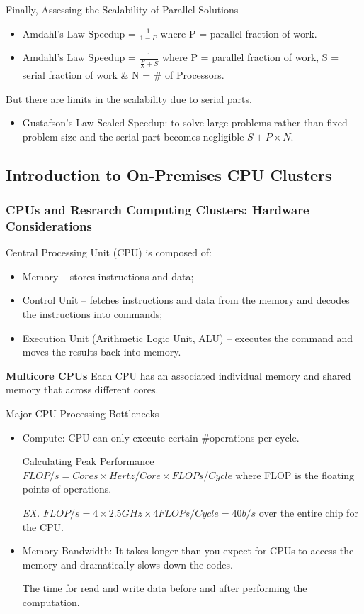 \documentclass{article}
\begin{document}
Finally, Assessing the Scalability of Parallel Solutions
\begin{itemize}
    \item Amdahl’s Law Speedup = $\frac{1}{1-P}$ where P = parallel fraction of work.
    \item Amdahl’s Law Speedup = $\frac{1}{\frac{P}{N} + S}$ where P = parallel fraction of work, S = serial fraction of work \& N = \# of Processors.
\end{itemize}
But there are limits in the scalability due to serial parts.
\begin{itemize}
    \item Gustafson’s Law Scaled Speedup: to solve large problems rather than fixed problem size and the serial part becomes negligible $S + P \times N$.
\end{itemize}

\subsection{Introduction to On-Premises CPU Clusters}

\subsubsection{CPUs and Resrarch Computing Clusters: Hardware Considerations}

Central Processing Unit (CPU) is composed of:
\begin{itemize}
    \item Memory – stores instructions and data;
    \item Control Unit – fetches instructions and data from the memory and decodes the instructions into commands;
    \item Execution Unit (Arithmetic Logic Unit, ALU) – executes the command and moves the results back into memory.
\end{itemize}

\textbf{Multicore CPUs} Each CPU has an associated individual memory and shared memory that across different cores.

Major CPU Processing Bottlenecks
\begin{itemize}
    \item Compute: CPU can only execute certain \#operations per cycle.
    
    Calculating Peak Performance $FLOP/s = Cores \times Hertz/Core \times FLOPs/Cycle$ where FLOP is the floating points of operations.
    
    \textit{EX.} $FLOP/s = 4 \times 2.5GHz \times 4FLOPs/Cycle = 40b/s$ over the entire chip for the CPU.
    
    \item Memory Bandwidth: It takes longer than you expect for CPUs to access the memory and dramatically slows down the codes.
    
    The time for read and write data before and after performing the computation.
\end{itemize}
\end{document}
